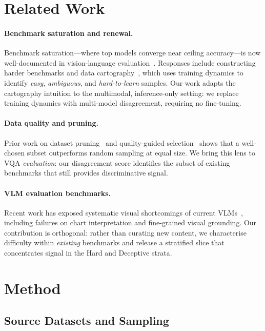 \documentclass[10pt,twocolumn,letterpaper]{article}
\begin{document}
\section{Related Work}
\label{sec:related}

\paragraph{Benchmark saturation and renewal.}
Benchmark saturation---where top models converge near ceiling accuracy---is
now well-documented in vision-language evaluation~\cite{fu2024mmbench}.
Responses include constructing harder benchmarks and data
cartography~\cite{swayamdipta2020cartography}, which uses training dynamics
to identify \emph{easy}, \emph{ambiguous}, and \emph{hard-to-learn} samples.
Our work adapts the cartography intuition to the multimodal, inference-only
setting: we replace training dynamics with multi-model disagreement,
requiring no fine-tuning.

\paragraph{Data quality and pruning.}
Prior work on dataset pruning~\cite{sorscher2022beyond} and
quality-guided selection~\cite{gadre2024datacomp} shows that a well-chosen
subset outperforms random sampling at equal size.  We bring this lens to
VQA \emph{evaluation}: our disagreement score identifies the subset of
existing benchmarks that still provides discriminative signal.

\paragraph{VLM evaluation benchmarks.}
Recent work has exposed systematic visual shortcomings of current
VLMs~\cite{tong2024mmvp}, including failures on chart interpretation and
fine-grained visual grounding.  Our contribution is orthogonal: rather than
curating new content, we characterise difficulty within \emph{existing}
benchmarks and release a stratified slice that concentrates signal in the
Hard and Deceptive strata.

\section{Method}
\label{sec:method}

\subsection{Source Datasets and Sampling}
\label{sec:datasets}
\end{document}
